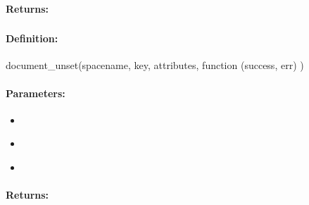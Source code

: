 \paragraph{Returns:}


\pagebreak
\subsubsection{}
\label{api:nodejs:document_unset}


\paragraph{Definition:}
\begin{javascriptcode}
document_unset(spacename, key, attributes, function (success, err) {})
\end{javascriptcode}
\paragraph{Parameters:}
\begin{itemize}[noitemsep]
\item {}\\

\item {}\\

\item {}\\

\end{itemize}

\paragraph{Returns:}


\pagebreak
\subsubsection{}
\label{api:nodejs:group_document_set}



